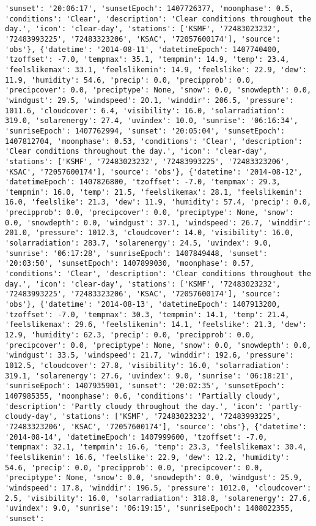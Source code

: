 \documentclass[
  letterpaper,
  DIV=11,
  numbers=noendperiod]{scrartcl}
\begin{document}
\begin{verbatim}
'sunset': '20:06:17', 'sunsetEpoch': 1407726377, 'moonphase': 0.5, 'conditions': 'Clear', 'description': 'Clear conditions throughout the day.', 'icon': 'clear-day', 'stations': ['KSMF', '72483023232', '72483993225', '72483323206', 'KSAC', '72057600174'], 'source': 'obs'}, {'datetime': '2014-08-11', 'datetimeEpoch': 1407740400, 'tzoffset': -7.0, 'tempmax': 35.1, 'tempmin': 14.9, 'temp': 23.4, 'feelslikemax': 33.1, 'feelslikemin': 14.9, 'feelslike': 22.9, 'dew': 11.9, 'humidity': 54.6, 'precip': 0.0, 'precipprob': 0.0, 'precipcover': 0.0, 'preciptype': None, 'snow': 0.0, 'snowdepth': 0.0, 'windgust': 29.5, 'windspeed': 20.1, 'winddir': 206.5, 'pressure': 1011.6, 'cloudcover': 6.4, 'visibility': 16.0, 'solarradiation': 319.0, 'solarenergy': 27.4, 'uvindex': 10.0, 'sunrise': '06:16:34', 'sunriseEpoch': 1407762994, 'sunset': '20:05:04', 'sunsetEpoch': 1407812704, 'moonphase': 0.53, 'conditions': 'Clear', 'description': 'Clear conditions throughout the day.', 'icon': 'clear-day', 'stations': ['KSMF', '72483023232', '72483993225', '72483323206', 'KSAC', '72057600174'], 'source': 'obs'}, {'datetime': '2014-08-12', 'datetimeEpoch': 1407826800, 'tzoffset': -7.0, 'tempmax': 29.3, 'tempmin': 16.0, 'temp': 21.5, 'feelslikemax': 28.1, 'feelslikemin': 16.0, 'feelslike': 21.3, 'dew': 11.9, 'humidity': 57.4, 'precip': 0.0, 'precipprob': 0.0, 'precipcover': 0.0, 'preciptype': None, 'snow': 0.0, 'snowdepth': 0.0, 'windgust': 37.1, 'windspeed': 26.7, 'winddir': 201.0, 'pressure': 1012.3, 'cloudcover': 14.0, 'visibility': 16.0, 'solarradiation': 283.7, 'solarenergy': 24.5, 'uvindex': 9.0, 'sunrise': '06:17:28', 'sunriseEpoch': 1407849448, 'sunset': '20:03:50', 'sunsetEpoch': 1407899030, 'moonphase': 0.57, 'conditions': 'Clear', 'description': 'Clear conditions throughout the day.', 'icon': 'clear-day', 'stations': ['KSMF', '72483023232', '72483993225', '72483323206', 'KSAC', '72057600174'], 'source': 'obs'}, {'datetime': '2014-08-13', 'datetimeEpoch': 1407913200, 'tzoffset': -7.0, 'tempmax': 30.3, 'tempmin': 14.1, 'temp': 21.4, 'feelslikemax': 29.6, 'feelslikemin': 14.1, 'feelslike': 21.3, 'dew': 12.9, 'humidity': 62.3, 'precip': 0.0, 'precipprob': 0.0, 'precipcover': 0.0, 'preciptype': None, 'snow': 0.0, 'snowdepth': 0.0, 'windgust': 33.5, 'windspeed': 21.7, 'winddir': 192.6, 'pressure': 1012.5, 'cloudcover': 27.8, 'visibility': 16.0, 'solarradiation': 319.1, 'solarenergy': 27.6, 'uvindex': 9.0, 'sunrise': '06:18:21', 'sunriseEpoch': 1407935901, 'sunset': '20:02:35', 'sunsetEpoch': 1407985355, 'moonphase': 0.6, 'conditions': 'Partially cloudy', 'description': 'Partly cloudy throughout the day.', 'icon': 'partly-cloudy-day', 'stations': ['KSMF', '72483023232', '72483993225', '72483323206', 'KSAC', '72057600174'], 'source': 'obs'}, {'datetime': '2014-08-14', 'datetimeEpoch': 1407999600, 'tzoffset': -7.0, 'tempmax': 32.1, 'tempmin': 16.6, 'temp': 23.3, 'feelslikemax': 30.4, 'feelslikemin': 16.6, 'feelslike': 22.9, 'dew': 12.2, 'humidity': 54.6, 'precip': 0.0, 'precipprob': 0.0, 'precipcover': 0.0, 'preciptype': None, 'snow': 0.0, 'snowdepth': 0.0, 'windgust': 25.9, 'windspeed': 17.8, 'winddir': 196.5, 'pressure': 1012.0, 'cloudcover': 2.5, 'visibility': 16.0, 'solarradiation': 318.8, 'solarenergy': 27.6, 'uvindex': 9.0, 'sunrise': '06:19:15', 'sunriseEpoch': 1408022355, 'sunset': 
\end{verbatim}
\end{document}
